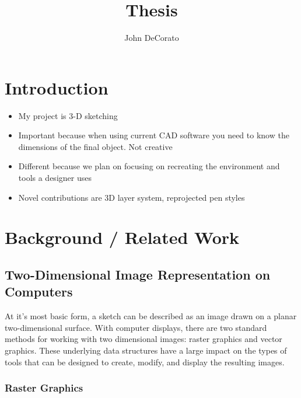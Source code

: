 \documentclass[12pt]{report}
\title{Thesis}
\author{John DeCorato}
\date{ }
\begin{document}
 
\maketitle
 
\tableofcontents

\pagebreak
\chapter{Introduction}

\begin{itemize}
	\item My project is 3-D sketching
	\item Important because when using current CAD software you need to know the dimensions of the final object. Not creative
	\item Different because we plan on focusing on recreating the environment and tools a designer uses
	\item Novel contributions are 3D layer system, reprojected pen styles 
\end{itemize}

\pagebreak
\chapter{Background / Related Work}

\section{Two-Dimensional Image Representation on Computers}

At it's most basic form, a sketch can be described as an image drawn on a planar two-dimensional surface.
With computer displays, there are two standard methods for working with two dimensional images: raster graphics and vector graphics.
These underlying data structures have a large impact on the types of tools that can be designed to create, modify, and display the resulting images.

\subsection{Raster Graphics}
\end{document}

